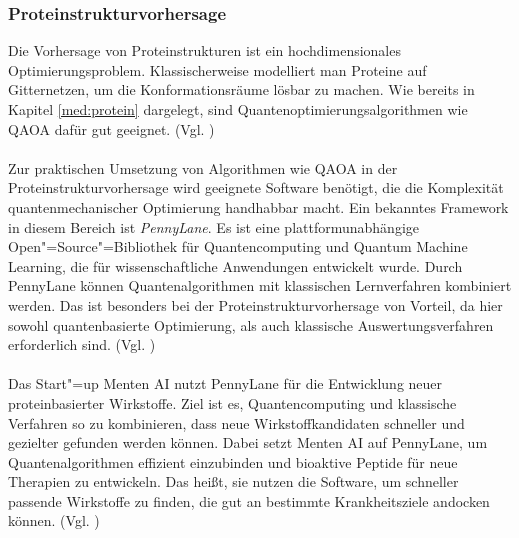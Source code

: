 
\subsubsection*{Proteinstrukturvorhersage}
Die Vorhersage von Proteinstrukturen ist ein hochdimensionales Optimierungsproblem. Klassischerweise modelliert man Proteine auf Gitternetzen, um die Konformationsräume lösbar zu machen. Wie bereits in Kapitel \ref{med:protein} dargelegt, sind Quantenoptimierungsalgorithmen wie QAOA dafür gut geeignet. (Vgl. \cite{boulebnane_peptide_2023})\\
\\
Zur praktischen Umsetzung von Algorithmen wie QAOA in der Proteinstrukturvorhersage wird geeignete Software benötigt, die die Komplexität quantenmechanischer Optimierung handhabbar macht. Ein bekanntes Framework in diesem Bereich ist \textit{PennyLane}. Es ist eine plattformunabhängige Open"=Source"=Bibliothek für Quantencomputing und Quantum Machine Learning, die für wissenschaftliche Anwendungen entwickelt wurde. Durch PennyLane können Quantenalgorithmen mit klassischen Lernverfahren kombiniert werden. Das ist besonders bei der Proteinstrukturvorhersage von Vorteil, da hier sowohl quantenbasierte Optimierung, als auch klassische Auswertungsverfahren erforderlich sind. (Vgl. \cite{noauthor_what_nodate})\\
\\
Das Start"=up Menten AI nutzt PennyLane für die Entwicklung neuer proteinbasierter Wirkstoffe. Ziel ist es, Quantencomputing und klassische Verfahren so zu kombinieren, dass neue Wirkstoffkandidaten schneller und gezielter gefunden werden können. Dabei setzt Menten AI auf PennyLane, um Quantenalgorithmen effizient einzubinden und bioaktive Peptide für neue Therapien zu entwickeln. Das heißt, sie nutzen die Software, um schneller passende Wirkstoffe zu finden, die gut an bestimmte Krankheitsziele andocken können. (Vgl. \cite{abdel-kareemXanaduUSAir2025})\\

